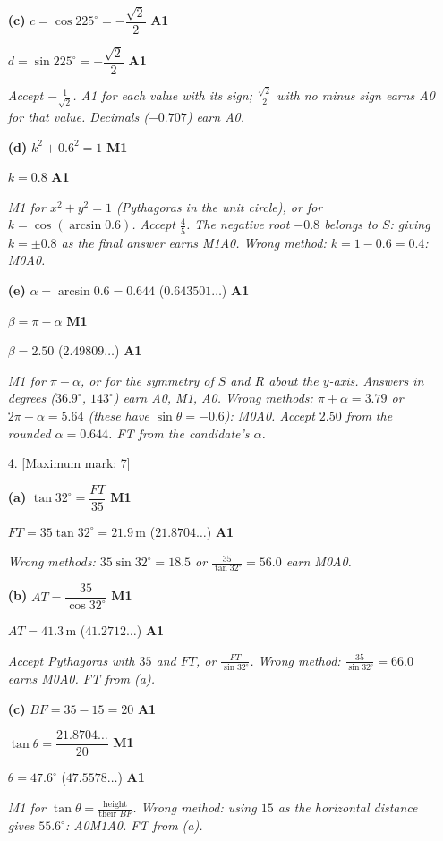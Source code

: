 \documentclass[12pt, twoside]{article}
\begin{document}
\begin{enumerate}[itemsep=0.3cm]
\textbf{(c)} $c = \cos 225^\circ = -\dfrac{\sqrt{2}}{2}$ \hfill \textbf{A1}

$d = \sin 225^\circ = -\dfrac{\sqrt{2}}{2}$ \hfill \textbf{A1}

\emph{Accept $-\frac{1}{\sqrt{2}}$. A1 for each value with its sign;
$\frac{\sqrt{2}}{2}$ with no minus sign earns A0 for that value. Decimals
($-0.707$) earn A0.}

\textbf{(d)} $k^{2} + 0.6^{2} = 1$ \hfill \textbf{M1}

$k = 0.8$ \hfill \textbf{A1}

\emph{M1 for $x^{2} + y^{2} = 1$ (Pythagoras in the unit circle), or for
$k = \cos\left(\arcsin 0.6\right)$. Accept $\frac{4}{5}$. The negative root
$-0.8$ belongs to $S$: giving $k = \pm 0.8$ as the final answer earns
M1A0. Wrong method: $k = 1 - 0.6 = 0.4$: M0A0.}

\textbf{(e)} $\alpha = \arcsin 0.6 = 0.644$ \quad ($0.643501\ldots$) \hfill \textbf{A1}

$\beta = \pi - \alpha$ \hfill \textbf{M1}

$\beta = 2.50$ \quad ($2.49809\ldots$) \hfill \textbf{A1}

\emph{M1 for $\pi - \alpha$, or for the symmetry of $S$ and $R$ about the
$y$-axis. Answers in degrees ($36.9^\circ$, $143^\circ$) earn A0, M1, A0.
Wrong methods: $\pi + \alpha = 3.79$ or $2\pi - \alpha = 5.64$ (these have
$\sin\theta = -0.6$): M0A0. Accept $2.50$ from the rounded
$\alpha = 0.644$. FT from the candidate's $\alpha$.}

\newpage

\item[4.] [Maximum mark: 7]

\textbf{(a)} $\tan 32^\circ = \dfrac{FT}{35}$ \hfill \textbf{M1}

$FT = 35\tan 32^\circ = 21.9\,\text{m}$ \quad ($21.8704\ldots$) \hfill \textbf{A1}

\emph{Wrong methods: $35\sin 32^\circ = 18.5$ or
$\frac{35}{\tan 32^\circ} = 56.0$ earn M0A0.}

\textbf{(b)} $AT = \dfrac{35}{\cos 32^\circ}$ \hfill \textbf{M1}

$AT = 41.3\,\text{m}$ \quad ($41.2712\ldots$) \hfill \textbf{A1}

\emph{Accept Pythagoras with $35$ and $FT$, or $\frac{FT}{\sin 32^\circ}$.
Wrong method: $\frac{35}{\sin 32^\circ} = 66.0$ earns M0A0. FT from (a).}

\textbf{(c)} $BF = 35 - 15 = 20$ \hfill \textbf{A1}

$\tan\theta = \dfrac{21.8704\ldots}{20}$ \hfill \textbf{M1}

$\theta = 47.6^\circ$ \quad ($47.5578\ldots$) \hfill \textbf{A1}

\emph{M1 for $\tan\theta = \frac{\text{height}}{\text{their } BF}$. Wrong
method: using $15$ as the horizontal distance gives $55.6^\circ$: A0M1A0.
FT from (a).}

\end{enumerate}
\end{document}

